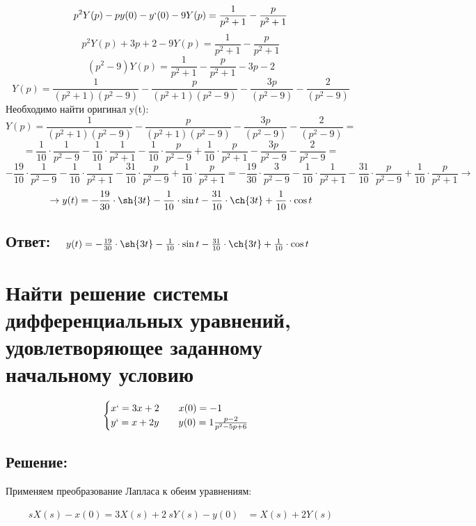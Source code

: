 \documentclass{article}
\begin{document}
        $$p^2Y(p) - py(0) - y`(0) - 9Y(p) = \frac{1}{p^2 + 1} - \frac{p}{p^2 + 1}$$
        $$ p^2Y(p) + 3p + 2 - 9Y(p) = \frac{1}{p^2 + 1} - \frac{p}{p^2 + 1}$$
        $$(p^2 - 9)Y(p) = \frac{1}{p^2 + 1} - \frac{p}{p^2 + 1} - 3p - 2 $$
        $$Y(p) = \frac{1}{(p^2 + 1)(p^2 - 9)} - \frac{p}{(p^2 + 1)(p^2 - 9)} - \frac{3p}{(p^2 - 9)} - \frac{2}{(p^2 - 9)}$$
        Необходимо найти оригинал y(t):
        $$Y(p) = \frac{1}{(p^2 + 1)(p^2 - 9)} - \frac{p}{(p^2 + 1)(p^2 - 9)} - \frac{3p}{(p^2 - 9)} - \frac{2}{(p^2 - 9)} = $$
        $$ = \frac{1}{10} \cdot \frac{1}{p^2 - 9} - \frac{1}{10} \cdot \frac{1}{p^2 + 1} - \frac{1}{10} \cdot \frac{p}{p^2 - 9} + \frac{1}{10} \cdot \frac{p}{p^2 + 1} - \frac{3p}{p^2 - 9} - \frac{2}{p^2 - 9} = $$
        $$-\frac{19}{10} \cdot \frac{1}{p^2 - 9} - \frac{1}{10} \cdot \frac{1}{p^2 + 1} - \frac{31}{10} \cdot \frac{p}{p^2 - 9} + \frac{1}{10} \cdot \frac{p}{p^2 + 1} = -\frac{19}{30}\cdot \frac{3}{p^2 - 9} - \frac{1}{10} \cdot \frac{1}{p^2 + 1} - \frac{31}{10} \cdot \frac{p}{p^2 - 9} + \frac{1}{10} \cdot \frac{p}{p^2 + 1} \rightarrow$$
        $$\rightarrow y(t) = -\frac{19}{30} \cdot \sh{3t} - \frac{1}{10} \cdot \sin{t} - \frac{31}{10} \cdot \ch{3t} + \frac{1}{10} \cdot \cos{t}$$
        \subsection{Ответ: $ \quad y(t) = -\frac{19}{30} \cdot \sh{3t} - \frac{1}{10} \cdot \sin{t} - \frac{31}{10} \cdot \ch{3t} + \frac{1}{10} \cdot \cos{t}$}

        \section{Найти решение системы дифференциальных уравнений, удовлетворяющее заданному начальному условию }
        \[
            \begin{cases} x` = 3x + 2 \quad\quad x(0) = -1\\ y` = x + 2y \quad\quad y(0) = 1  \frac{p - 2}{p^2 - 5p + 6} \end {cases} 
        \]
         \subsection{Решение:}
        Применяем преобразование Лапласа к обеим уравнениям: 
        
        \begin{align*} sX(s) - x(0) = 3X(s) + 2 \ sY(s) - y(0) & = X(s) + 2Y(s) \end{align*}
         
\end{document}
